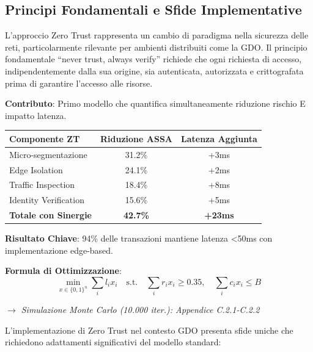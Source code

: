 \subsection{Principi Fondamentali e Sfide Implementative}

L'approccio Zero Trust rappresenta un cambio di paradigma nella sicurezza delle reti, particolarmente rilevante per ambienti distribuiti come la GDO. Il principio fondamentale ``never trust, always verify'' richiede che ogni richiesta di accesso, indipendentemente dalla sua origine, sia autenticata, autorizzata e crittografata prima di garantire l'accesso alle risorse.

\begin{tcolorbox}[
    colback=green!5!white,
    colframe=green!65!black,
    title={\textbf{Innovation Box 2.2:} Modello Quantitativo Zero Trust per GDO},
    fonttitle=\bfseries,
    boxrule=1.5pt,
    arc=2mm
]
\textbf{Contributo}: Primo modello che quantifica simultaneamente riduzione rischio E impatto latenza.

\vspace{0.3cm}
\begin{center}
\begin{tabular}{lcc}
\toprule
\textbf{Componente ZT} & \textbf{Riduzione ASSA} & \textbf{Latenza Aggiunta} \\
\midrule
Micro-segmentazione & 31.2\% & +3ms \\
Edge Isolation & 24.1\% & +2ms \\
Traffic Inspection & 18.4\% & +8ms \\
Identity Verification & 15.6\% & +5ms \\
\textbf{Totale con Sinergie} & \textbf{42.7\%} & \textbf{+23ms} \\
\bottomrule
\end{tabular}
\end{center}

\vspace{0.3cm}
\textbf{Risultato Chiave}: 94\% delle transazioni mantiene latenza <50ms con implementazione edge-based.

\vspace{0.3cm}
\textbf{Formula di Ottimizzazione}:
\begin{equation*}
\min_{x \in \{0,1\}^n} \sum_{i} l_i x_i \quad \text{s.t.} \quad \sum_{i} r_i x_i \geq 0.35, \quad \sum_{i} c_i x_i \leq B
\end{equation*}

\textit{$\rightarrow$ Simulazione Monte Carlo (10.000 iter.): Appendice C.2.1-C.2.2}
\end{tcolorbox}
L'implementazione di Zero Trust nel contesto GDO presenta sfide uniche che richiedono adattamenti significativi del modello standard:

